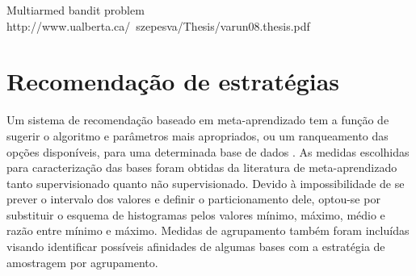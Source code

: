 

Multiarmed bandit problem
http://www.ualberta.ca/~szepesva/Thesis/varun08.thesis.pdf

\section{Recomendação de estratégias}\label{recom}
Um sistema de recomendação baseado em meta-aprendizado tem a função de sugerir
o algoritmo e parâmetros mais apropriados, ou um ranqueamento das opções disponíveis,
para uma determinada base de dados \citep{books/daglib/0022052}.
As medidas escolhidas para caracterização das bases foram obtidas da literatura
de meta-aprendizado tanto supervisionado quanto não supervisionado.
Devido à impossibilidade de se prever o intervalo dos valores e definir
o particionamento dele, optou-se por substituir o esquema de histogramas
pelos valores mínimo, máximo, médio e razão entre mínimo e máximo.
Medidas de agrupamento também foram incluídas visando identificar possíveis afinidades
de algumas bases com a estratégia de amostragem por agrupamento.
